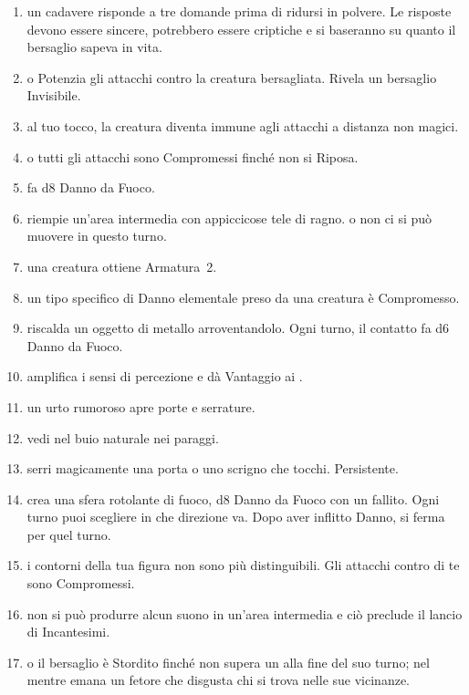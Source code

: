 \documentclass[itdr]{subfiles}
\begin{document}
\begin{enumerate}
	\item {} un cadavere risponde a tre domande prima di ridursi in polvere. Le risposte devono essere sincere, potrebbero essere criptiche e si baseranno su quanto il bersaglio sapeva in vita.
	\item {}  o Potenzia gli attacchi contro la creatura bersagliata. Rivela un bersaglio Invisibile.
	\item {} al tuo tocco, la creatura diventa immune agli attacchi a distanza non magici.
	\item {}  o tutti gli attacchi sono Compromessi finché non si Riposa.
	\item {} fa d8 Danno da Fuoco.
	\item {} riempie un'area intermedia con appiccicose tele di ragno.  o non ci si può muovere in questo turno.
	\item {} una creatura ottiene Armatura~2.
	\item {} un tipo specifico di Danno elementale preso da una creatura è Compromesso.
	\item {} riscalda un oggetto di metallo arroventandolo. Ogni turno, il contatto fa d6 Danno da Fuoco.
	\item {} amplifica i sensi di percezione e dà Vantaggio ai .
	\item {} un urto rumoroso apre porte e serrature.
	\item {} vedi nel buio naturale nei paraggi.
	\item {} serri magicamente una porta o uno scrigno che tocchi. Persistente.
	\item {} crea una sfera rotolante di fuoco, d8 Danno da Fuoco con un  fallito. Ogni turno puoi scegliere in che direzione va. Dopo aver inflitto Danno, si ferma per quel turno.
	\item {} i contorni della tua figura non sono più distinguibili. Gli attacchi contro di te sono Compromessi.
	\item {} non si può produrre alcun suono in un'area intermedia e ciò preclude il lancio di Incantesimi.
	\item {}  o il bersaglio è Stordito finché non supera un  alla fine del suo turno; nel mentre emana un fetore che disgusta chi si trova nelle sue vicinanze.

\end{enumerate}
\end{document}
